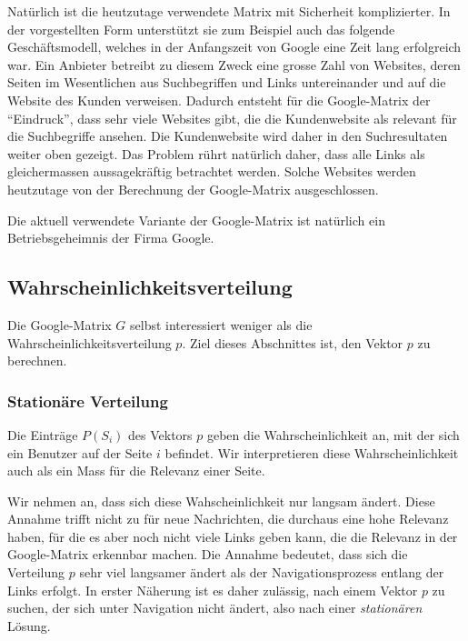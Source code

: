Natürlich ist die heutzutage verwendete Matrix mit Sicherheit komplizierter.
In der vorgestellten Form unterstützt sie zum Beispiel auch das folgende
Geschäftsmodell, welches in der Anfangszeit von Google eine Zeit lang 
erfolgreich war.
Ein Anbieter betreibt zu diesem Zweck eine grosse Zahl von Websites,
deren Seiten im Wesentlichen aus Suchbegriffen und Links untereinander
und auf die Website des Kunden verweisen.
Dadurch entsteht für die Google-Matrix der ``Eindruck'', dass sehr viele
Websites gibt, die die Kundenwebsite als relevant für die Suchbegriffe 
ansehen.
Die Kundenwebsite wird daher in den Suchresultaten weiter oben gezeigt.
Das Problem rührt natürlich daher, dass alle Links als gleichermassen
aussagekräftig betrachtet werden.
Solche Websites werden heutzutage von der Berechnung der Google-Matrix
ausgeschlossen.

Die aktuell verwendete Variante der Google-Matrix ist natürlich ein
Betriebsgeheimnis der Firma Google.

%
%
\subsection{Wahrscheinlichkeitsverteilung
\label{buch:subsection:wahrscheinlichkeitsverteilung}}
Die Google-Matrix $G$ selbst interessiert weniger als die
Wahrscheinlichkeitsverteilung $p$.
Ziel dieses Abschnittes ist, den Vektor $p$ zu berechnen.

\subsubsection{Stationäre Verteilung}
Die Einträge $P(S_i)$ des Vektors $p$ geben die Wahrscheinlichkeit an, mit
der sich ein Benutzer auf der Seite $i$ befindet.
Wir interpretieren diese Wahrscheinlichkeit auch als ein Mass für die
Relevanz einer Seite.

Wir nehmen an, dass sich diese Wahscheinlichkeit nur langsam ändert.
Diese Annahme trifft nicht zu für neue Nachrichten, die durchaus eine
hohe Relevanz haben, für die es aber noch nicht viele Links geben kann,
die die Relevanz in der Google-Matrix erkennbar machen.
Die Annahme bedeutet, dass sich die Verteilung $p$ sehr viel langsamer 
ändert als der Navigationsprozess entlang der Links erfolgt.
In erster Näherung ist es daher zulässig, nach einem Vektor $p$ zu
suchen, der sich unter Navigation nicht ändert, also nach einer
{\em stationären} Lösung.
%

